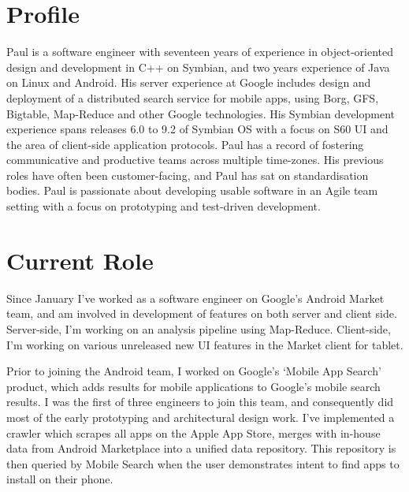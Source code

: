 \documentclass[margin,line]{resume}
\begin{document}
\begin{resume}
    \section{\mysidestyle Profile}

    Paul is a software engineer with seventeen years of experience in object-oriented design and development
    in C++  on Symbian, and two years experience of Java on Linux and Android.  His server experience at Google
    includes design and deployment of a distributed search service for mobile apps, using Borg, GFS, Bigtable,
    Map-Reduce and other Google technologies.  His Symbian development experience spans releases 6.0 to 9.2
    of Symbian OS with a focus on S60 UI and the area of client-side application protocols.
    Paul has a record of fostering communicative and productive teams across multiple
    time-zones. His previous roles have often been customer-facing, and Paul has sat on standardisation bodies.
    Paul is passionate about developing usable software in an Agile team setting with a focus on prototyping and
    test-driven development.


    \section{\mysidestyle Current Role}

    Since January I've worked as a software engineer on Google's Android Market team, and am involved in
    development of features on both server and client side.  Server-side, I'm working on an analysis pipeline using
    Map-Reduce.  Client-side, I'm working on various unreleased new UI features in the Market client for tablet.
    
    Prior to joining the Android team, I worked on Google's `Mobile App Search' product, which adds results for mobile
    applications to Google's mobile search results.  I was the first of three engineers to join this team, and consequently
    did most of the early prototyping and architectural design work.  I've implemented a crawler which scrapes all apps
    on the Apple App Store, merges with in-house data from Android Marketplace into a unified data repository. This
    repository is then queried by Mobile Search when the user demonstrates intent to find apps to install on their phone.
    

\end{resume}
\end{document}
